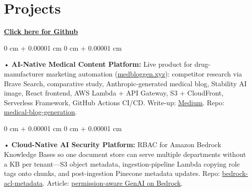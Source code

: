 \documentclass[10pt, letterpaper]{article}
\newenvironment{onecolentry}{
    \begin{adjustwidth}{
        0 cm + 0.00001 cm
    }{
        0 cm + 0.00001 cm
    }
}{
    \end{adjustwidth}
} %
\begin{document}
\section{Projects}
    \vspace{2 pt}
\textbf{\href{https://github.com/daedalus-s}{Click here for Github}}
\begin{onecolentry}
     • \textbf{AI-Native Medical Content Platform:} Live product for drug-manufacturer marketing automation (\href{https://medbloggen.xyz}{medbloggen.xyz}): competitor research via Brave Search, comparative study, Anthropic-generated medical blog, Stability AI image, React frontend, AWS Lambda + API Gateway, S3 + CloudFront, Serverless Framework, GitHub Actions CI/CD. Write-up: \href{https://medium.com/@sreenikethaathreya/medical-blog-writing-using-genai-0b7e78b6032f}{Medium}. Repo: \href{https://github.com/daedalus-s/medical-blog-generation}{medical-blog-generation}.
\end{onecolentry}
\begin{onecolentry}
     • \textbf{Cloud-Native AI Security Platform:} RBAC for Amazon Bedrock Knowledge Bases so one document store can serve multiple departments without a KB per tenant---S3 object metadata, ingestion-pipeline Lambda copying role tags onto chunks, and post-ingestion Pinecone metadata updates. Repo: \href{https://github.com/daedalus-s/bedrock-acl-metadata}{bedrock-acl-metadata}. Article: \href{https://medium.com/@sreenikethaathreya/building-a-permission-aware-genai-application-on-amazon-bedrock-8fdc2410dd43}{permission-aware GenAI on Bedrock}.
\end{onecolentry}
\vspace{2 pt}
        \vspace{2 pt }
\end{document}
